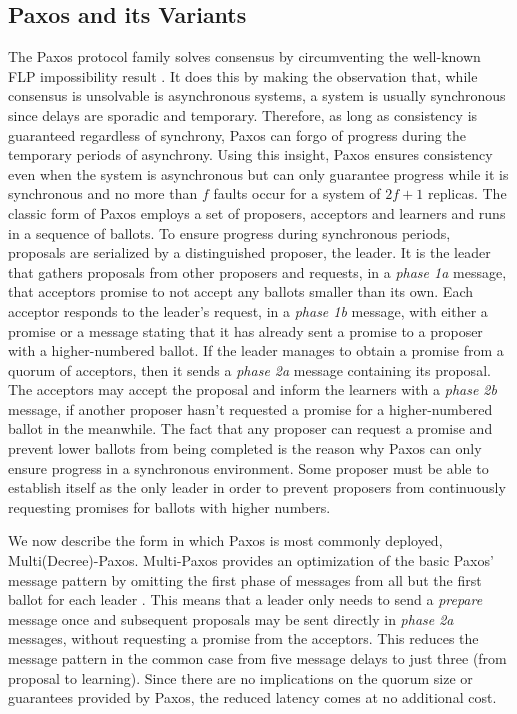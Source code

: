 \documentclass[runningheads,a4paper]{llncs}
\begin{document}
\subsection{Paxos and its Variants} \label{Paxos}

The Paxos protocol family solves consensus by circumventing the well-known FLP impossibility result \cite{Fischer1985}. It does this by making the observation that, while consensus is unsolvable is asynchronous systems, a system is usually synchronous since delays are sporadic and temporary. Therefore, as long as consistency is guaranteed regardless of synchrony, Paxos can forgo of progress during the temporary periods of asynchrony. Using this insight, Paxos ensures consistency even when the system is asynchronous but can only guarantee progress while it is synchronous and no more than $f$ faults occur for a system of $2f+1$ replicas. The classic form of Paxos employs a set of proposers, acceptors and learners and runs in a sequence of ballots. To ensure progress during synchronous periods, proposals are serialized by a distinguished proposer, the leader. It is the leader that gathers proposals from other proposers and requests, in a \textit{phase 1a} message, that acceptors promise to not accept any ballots smaller than its own. Each acceptor responds to the leader's request, in a \textit{phase 1b} message, with either a promise or a message stating that it has already sent a promise to a proposer with a higher-numbered ballot. If the leader manages to obtain a promise from a quorum of acceptors, then it sends a \textit{phase 2a} message containing its proposal. The acceptors may accept the proposal and inform the learners with a \textit{phase 2b} message, if another proposer hasn't requested a promise for a higher-numbered ballot in the meanwhile. The fact that any proposer can request a promise and prevent lower ballots from being completed is the reason why Paxos can only ensure progress in a synchronous environment. Some proposer must be able to establish itself as the only leader in order to prevent proposers from continuously requesting promises for ballots with higher numbers. \par
We now describe the form in which Paxos is most commonly deployed, Multi(Decree)-Paxos. Multi-Paxos provides an optimization of the basic Paxos' message pattern by omitting the first phase of messages from all but the first ballot for each leader \cite{Renesse2011}. This means that a leader only needs to send a \textit{prepare} message once and subsequent proposals may be sent directly in \textit{phase 2a} messages, without requesting a promise from the acceptors. This reduces the message pattern in the common case from five message delays to just three (from proposal to learning). Since there are no implications on the quorum size or guarantees provided by Paxos, the reduced latency comes at no additional cost. \par
\end{document}

